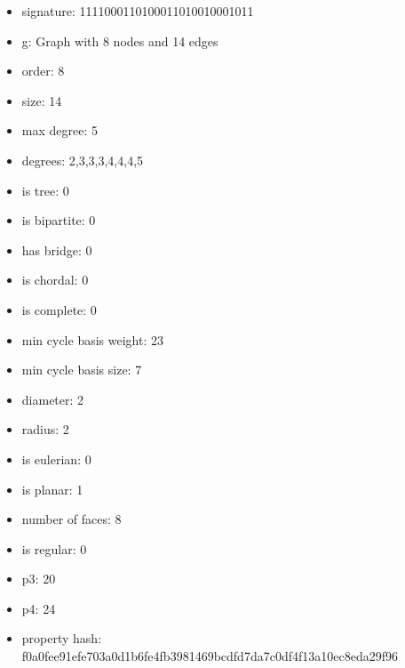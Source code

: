 \begin{itemize}
\item signature: 1111000110100011010010001011
\item g: Graph with 8 nodes and 14 edges
\item order: 8
\item size: 14
\item max degree: 5
\item degrees: 2,3,3,3,4,4,4,5
\item is tree: 0
\item is bipartite: 0
\item has bridge: 0
\item is chordal: 0
\item is complete: 0
\item min cycle basis weight: 23
\item min cycle basis size: 7
\item diameter: 2
\item radius: 2
\item is eulerian: 0
\item is planar: 1
\item number of faces: 8
\item is regular: 0
\item p3: 20
\item p4: 24
\item property hash: f0a0fee91efe703a0d1b6fe4fb3981469bcdfd7da7c0df4f13a10ec8eda29f96
\end{itemize}
\newpage
\begin{figure}
\end{figure}
